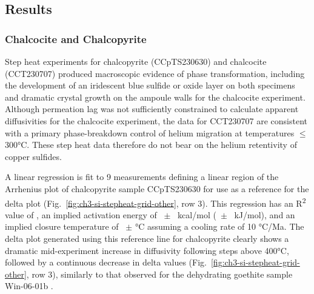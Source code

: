 \subsection*{Results}

\subsubsection*{Chalcocite and Chalcopyrite}
Step heat experiments for chalcopyrite (CCpTS230630) and
chalcocite (CCT230707) produced macroscopic evidence of phase
transformation, including the development of an iridescent blue sulfide
or oxide layer on both specimens and dramatic crystal growth on the
ampoule walls for the chalcocite experiment. Although
permeation lag was not sufficiently constrained to calculate apparent
diffusivities for the chalcocite experiment, the data for CCT230707 are
consistent with a primary phase-breakdown control of helium migration at
temperatures $\leq$300°C. These step heat data therefore do not bear on
the helium retentivity of copper sulfides. 

A linear regression is fit to 9 measurements defining a linear region of
the Arrhenius plot of chalcopyrite sample CCpTS230630 for use as a
reference for the delta plot (Fig.~\ref{fig:ch3-si-stepheat-grid-other}, row 3). This regression has an
R\textsuperscript{2} value of \ChThreeCCpRtwo, an implied activation energy of
\ChThreeCCpEaKcal\ $\pm$ \ChThreeCCpEaKcalErr\ kcal/mol (\ChThreeCCpEa\ $\pm$
\ChThreeCCpEaErr\ kJ/mol), and an implied closure temperature of
\ChThreeCCpTc\ $\pm$ \ChThreeCCpTcErr°C assuming a
cooling rate of 10 °C/Ma. The delta plot generated using this reference
line for chalcopyrite clearly shows a dramatic mid-experiment increase
in diffusivity following steps above 400°C, followed by a continuous
decrease in delta values (Fig.~\ref{fig:ch3-si-stepheat-grid-other}, row 3), similarly to that observed for
the dehydrating goethite sample Win-06-01b \citep{farley2024}.


